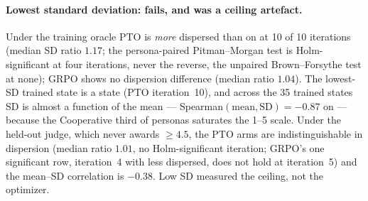 \paragraph{Lowest standard deviation: fails, and was a ceiling artefact.} Under the training
oracle PTO \Kf{} is \emph{more} dispersed than \Kz{} on \QQ{} at 10 of 10 iterations (median SD
ratio $1.17$; the persona-paired Pitman--Morgan test is Holm-significant at four iterations,
never the reverse, the unpaired Brown--Forsythe test at none); GRPO shows no dispersion
difference (median ratio $1.04$). The lowest-SD trained
state is a \Kz{} state (PTO \Kz{} iteration~10), and across the 35 trained states SD is almost
a function of the mean --- Spearman$(\text{mean}, \text{SD}) =
-0.87$ on \QQ{} --- because the Cooperative third of personas saturates the 1--5 scale. Under
the held-out judge, which never awards \QQ{} $\geq 4.5$, the PTO arms are indistinguishable in
dispersion (median ratio $1.01$, no Holm-significant iteration; GRPO's one significant row,
iteration~4 with \Kf{} less dispersed, does not hold at iteration~5) and the mean--SD
correlation is $-0.38$. Low SD measured
the ceiling, not the optimizer.

